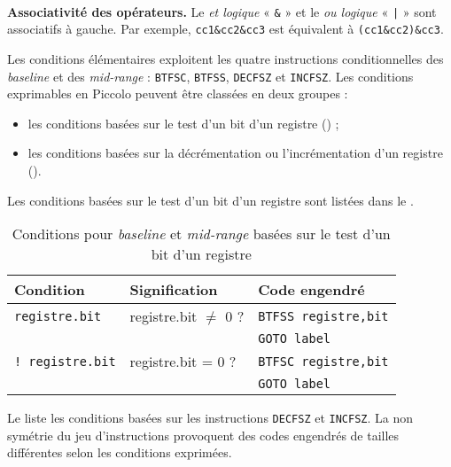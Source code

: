 ~\\
\textbf{Associativité des opérateurs.} Le \emph{et logique} « \texttt{\&} » et le \emph{ou logique} « \texttt{|} » sont associatifs à gauche. Par exemple, \texttt{cc1\&cc2\&cc3} est équivalent à \texttt{(cc1\&cc2)\&cc3}.



Les conditions élémentaires exploitent les quatre instructions conditionnelles des \emph{baseline} et des \emph{mid-range} : \texttt{BTFSC}, \texttt{BTFSS}, \texttt{DECFSZ} et \texttt{INCFSZ}. Les conditions exprimables en Piccolo peuvent être classées en deux groupes :
\begin{itemize}
  \item les conditions basées sur le test d'un bit d'un registre () ;
  \item les conditions basées sur la décrémentation ou l'incrémentation d'un registre ().
\end{itemize}


Les conditions basées sur le test d'un bit d'un registre sont listées dans le .

\begin{table}[!ht]
  \centering
  \small
  \begin{tabular}{lll}
    \textbf{Condition} & \textbf{Signification} & \textbf{Code engendré}\\
    \hline
                           \texttt{registre.bit}  & registre.bit $\ne$ 0 ? &\texttt{BTFSS registre,bit}\\
                                                  &                        & \texttt{GOTO label}\\
    \rowcolor{\fondTableau}\texttt{! registre.bit}  & registre.bit = 0 ? & \texttt{BTFSC registre,bit} \\
    \rowcolor{\fondTableau}                         &                    & \texttt{GOTO label}\\
    \hline
  \end{tabular}
  \caption{Conditions pour \emph{baseline} et \emph{mid-range} basées sur le test d'un bit d'un registre}
\end{table}


Le  liste les conditions basées sur les instructions \texttt{DECFSZ} et \texttt{INCFSZ}. La non symétrie du jeu d'instructions provoquent des codes engendrés de tailles différentes selon les conditions exprimées. 

